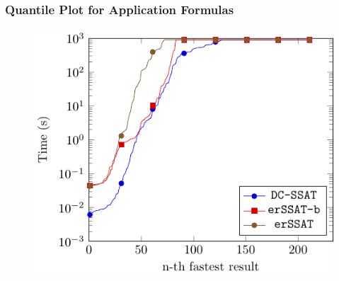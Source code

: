 \begin{frame}
    \frametitle{Quantile Plot for Application Formulas}
    \begin{figure}
        \centering
        \includegraphics{fig/exist-random-ssat/quantile-cputime-Application.pdf}
    \end{figure}
\end{frame}

